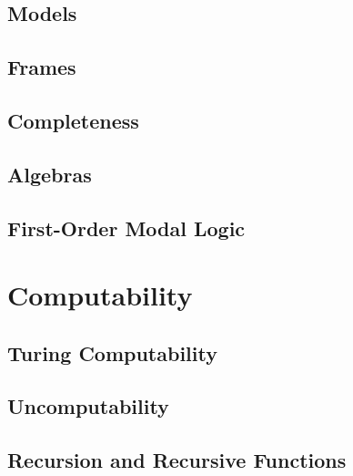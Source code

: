 \documentclass[12pt, a4paper, oneside, openright, titlepage]{book}
\begin{document}
\chapter{\textsection\textsection Models}


\chapter{\textsection\textsection Frames}


\chapter{\textsection\textsection Completeness}


\chapter{\textsection\textsection Algebras}


\chapter{\textsection\textsection First-Order Modal Logic}





\part{Computability}


\chapter{\textsection\textsection Turing Computability}


\chapter{\textsection\textsection Uncomputability}



\chapter{\textsection\textsection Recursion and Recursive Functions}
\end{document}

